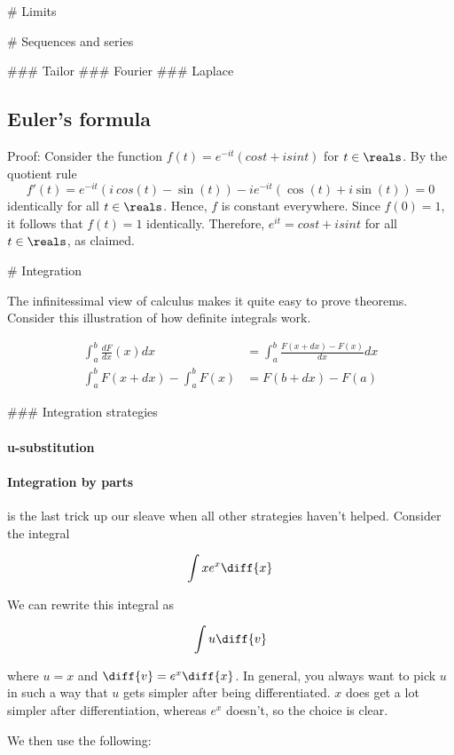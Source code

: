 # Limits

# Sequences and series

### Tailor
### Fourier
### Laplace

\subsection{Euler's formula}
Proof: Consider the function $f(t)=e^{-it}(cost+isint)$ for $t \in \reals$. By the quotient rule
$$ f'(t) = e^{-it} (i\ cos(t) - \sin(t)) -ie^{-it} (\cos(t) + i \sin(t)) = 0 $$
identically for all $t \in \reals$. Hence, $f$ is constant everywhere. Since $f(0)=1$, it follows that $f(t)=1$ identically. Therefore, $e^{it}=cost+isint$ for all $t \in \reals$, as claimed.


# Integration

The infinitessimal view of calculus makes it quite easy to prove theorems. Consider this illustration of how definite integrals work.

\begin{equation}
    \begin{aligned}
        \int_a^b \frac{dF}{dx}(x) dx &= \int_a^b \frac{F(x + dx) - F(x)}{dx} dx \\
        \int_a^b F(x + dx) - \int_a^b F(x) &= F(b + dx) - F(a)
    \end{aligned}
\end{equation}


### Integration strategies

\paragraph{u-substitution}

\paragraph{Integration by parts} is the last trick up our sleave when all other strategies haven't helped. Consider the integral 

$$ \int x e^x \diff{x} $$

We can rewrite this integral as 

$$ \int u \diff{v} $$

where $u = x$ and $\diff{v} = e^x \diff{x}$. In general, you always want to pick $u$ in such a way that $u$ gets simpler after being differentiated.
$x$ does get a lot simpler after differentiation, whereas $e^x$ doesn't, so the choice is clear. 

We then use the following: 

